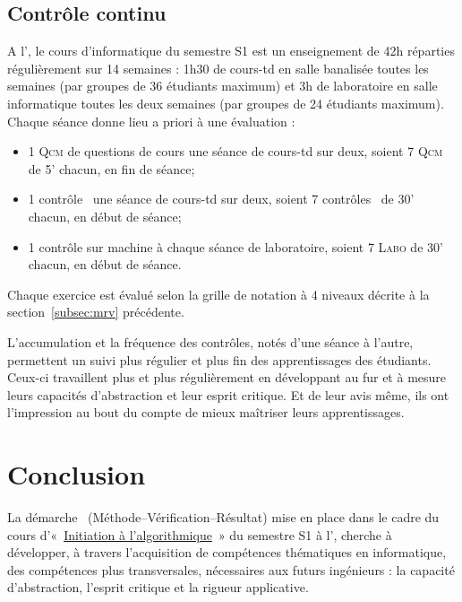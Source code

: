 \documentclass[11pt,a4paper,colorlinks,breaklinks]{article}
\begin{document}
\subsection{Contrôle continu}\label{subsec:cc}
A l'\enib, le cours d'informatique du semestre S1 est un enseignement de 42h réparties régulièrement sur 14 semaines : 1h30 de cours-td  en salle banalisée toutes les semaines (par groupes de 36 étudiants maximum) et 3h de laboratoire en salle informatique toutes les deux semaines (par groupes de 24 étudiants maximum). Chaque séance donne lieu a priori à une évaluation : 
\begin{itemize}
\item 1 \textsc{Qcm} de questions de cours une séance de cours-td sur deux, 
	soient 7 \textsc{Qcm} de 5' chacun, en fin de séance; 
\item 1 contrôle \mvr\ une séance de cours-td sur deux,
	soient 7 contrôles \mvr\ de 30' chacun, en début de séance; 
\item 1 contrôle sur machine à chaque séance de laboratoire,
	soient 7 \textsc{Labo} de 30' chacun, en début de séance.
\end{itemize}
Chaque exercice est évalué selon la grille de notation à 4 niveaux décrite à la 
section~\ref{subsec:mrv} précédente.

L'accumulation et la fréquence des contrôles, notés d'une séance à l'autre, permettent un suivi plus régulier et plus fin des apprentissages des étudiants. Ceux-ci travaillent plus et plus régulièrement en développant au fur et à mesure leurs capacités d'abstraction et leur esprit critique. Et de leur avis même, ils ont l'impression au bout du compte de mieux maîtriser leurs apprentissages.

\section{Conclusion}\label{sec:conclusion}
La démarche \mvr\ (Méthode--Vérification--Résultat) mise en place dans le cadre du cours d'«~\href{http://www.enib.fr/~tisseau/pdf/course/info-S1.pdf}{Initiation à l'algorithmique}~» du semestre S1 à l'\enib, cherche à développer, à travers l'acquisition de compétences thématiques en informatique, des compétences plus transversales, nécessaires aux futurs ingénieurs : la capacité d'abstraction, l'esprit critique et la rigueur applicative.
\end{document}
